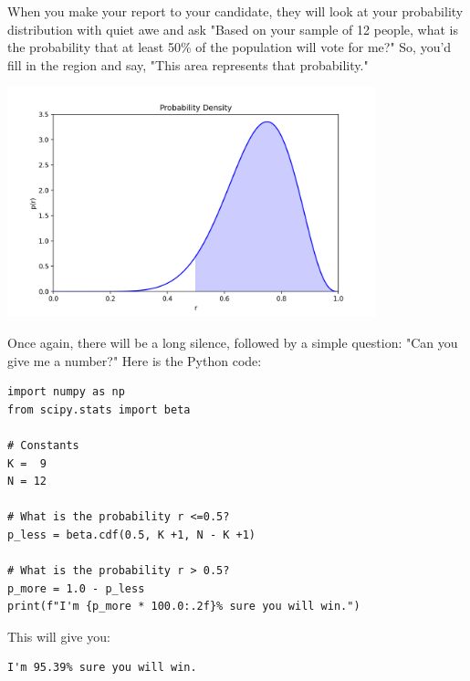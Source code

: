When you make your report to your candidate,  they will look at your probability distribution with quiet awe and ask "Based on your sample of 12 people, what is the probability that at least 50\% of the population will vote for me?"  So,  you'd fill in the region and say, "This area represents that probability."

\includegraphics[width=0.8\textwidth]{bayes50.png}

Once again,  there will be a long silence, followed by a simple question: "Can you give me a number?"  Here is the Python code:

\begin{verbatim}
import numpy as np
from scipy.stats import beta

# Constants
K =  9
N = 12

# What is the probability r <=0.5?
p_less = beta.cdf(0.5, K +1, N - K +1)

# What is the probability r > 0.5?
p_more = 1.0 - p_less
print(f"I'm {p_more * 100.0:.2f}% sure you will win.")
\end{verbatim}

This will give you:
\begin{verbatim}
I'm 95.39% sure you will win.
\end{verbatim}






